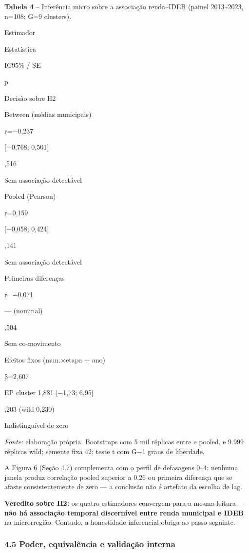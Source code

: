 \documentclass[
  brazilian,
  12pt,
  a4paper,
]{article}
\begin{document}
\textbf{Tabela 4} -- Inferência micro sobre a associação renda--IDEB
(painel 2013--2023, n=108; G=9 clusters).

Estimador

Estatística

IC95\% / SE

p

Decisão sobre H2

Between (médias municipais)

r=−0,237

{{[}−0,768; 0,501{]}}

,516

Sem associação detectável

Pooled (Pearson)

r=0,159

{{[}−0,058; 0,424{]}}

,141

Sem associação detectável

Primeiras diferenças

r=−0,071

--- (nominal)

,504

Sem co-movimento

Efeitos fixos (mun.×etapa + ano)

β=2,607

EP cluster 1,881 {{[}−1,73; 6,95{]}}

,203 (wild 0,230)

Indistinguível de zero

\emph{Fonte:} elaboração própria. Bootstraps com 5 mil réplicas entre e
pooled, e 9.999 réplicas wild; semente fixa 42; teste t com G−1 graus de
liberdade.

A Figura 6 (Seção 4.7) complementa com o perfil de defasagens 0--4:
nenhuma janela produz correlação pooled superior a 0,26 ou primeira
diferença que se afaste consistentemente de zero --- a conclusão não é
artefato da escolha de lag.

\textbf{Veredito sobre H2:} os quatro estimadores convergem para a mesma
leitura --- \textbf{não há associação temporal discernível entre renda
municipal e IDEB} na microrregião. Contudo, a honestidade inferencial
obriga ao passo seguinte.

\subsubsection{4.5 Poder, equivalência e validação
interna}\label{poder-equivaluxeancia-e-validauxe7uxe3o-interna}
\end{document}
